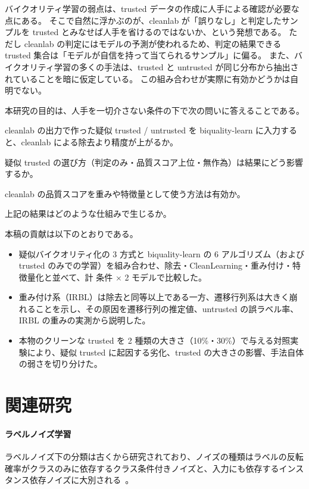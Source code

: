 \documentclass[a4paper,10pt]{ltjsarticle}
\newcommand{\cl}{\textsf{cleanlab}}
\newcommand{\bq}{\textsf{biquality-learn}}
\begin{document}
バイクオリティ学習の弱点は、trusted データの作成に人手による確認が必要な点にある。
そこで自然に浮かぶのが、\cl{} が「誤りなし」と判定したサンプルを trusted とみなせば人手を省けるのではないか、という発想である。
ただし \cl{} の判定にはモデルの予測が使われるため、判定の結果できる trusted 集合は「モデルが自信を持って当てられるサンプル」に偏る。
また、バイクオリティ学習の多くの手法は、trusted と untrusted が同じ分布から抽出されていることを暗に仮定している。
この組み合わせが実際に有効かどうかは自明でない。

本研究の目的は、人手を一切介さない条件の下で次の問いに答えることである。
\begin{description}[leftmargin=2.5em,style=nextline]
  \item[RQ1] \cl{} の出力で作った疑似 trusted / untrusted を \bq{} に入力すると、\cl{} による除去より精度が上がるか。
  \item[RQ2] 疑似 trusted の選び方（判定のみ・品質スコア上位・無作為）は結果にどう影響するか。
  \item[RQ3] \cl{} の品質スコアを重みや特徴量として使う方法は有効か。
  \item[RQ4] 上記の結果はどのような仕組みで生じるか。
\end{description}

本稿の貢献は以下のとおりである。
\begin{itemize}
  \item 疑似バイクオリティ化の 3 方式と \bq{} の 6 アルゴリズム（および trusted のみでの学習）を組み合わせ、除去・CleanLearning・重み付け・特徴量化と並べて、計 \NCond{} 条件 $\times$ 2 モデルで比較した。
  \item 重み付け系（IRBL）は除去と同等以上である一方、遷移行列系は大きく崩れることを示し、その原因を遷移行列の推定値、untrusted の誤ラベル率、IRBL の重みの実測から説明した。
  \item 本物のクリーンな trusted を 2 種類の大きさ（10\%・30\%）で与える対照実験により、疑似 trusted に起因する劣化、trusted の大きさの影響、手法自体の弱さを切り分けた。
\end{itemize}

\section{関連研究}

\paragraph{ラベルノイズ学習}
ラベルノイズ下の分類は古くから研究されており、ノイズの種類はラベルの反転確率がクラスのみに依存するクラス条件付きノイズと、入力にも依存するインスタンス依存ノイズに大別される~\cite{frenay2014survey,song2023survey}。
\end{document}
